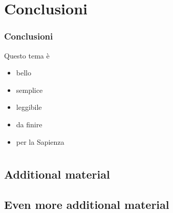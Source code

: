\documentclass{beamer}
\theoremstyle{definition}
\theoremstyle{plain}
\begin{document}
\section*{Conclusioni}
\begin{frame}
  \frametitle{Conclusioni}
  \begin{block}{Questo tema è}
    \begin{itemize}
      \item bello
      \item semplice
      \item leggibile
      \item da finire
      \item per la Sapienza
    \end{itemize}
  \end{block}
\end{frame}

\appendix
\section{\appendixname}
\frame{\tableofcontents}

\subsection{Additional material}

\subsection{Even more additional material}
\end{document}
